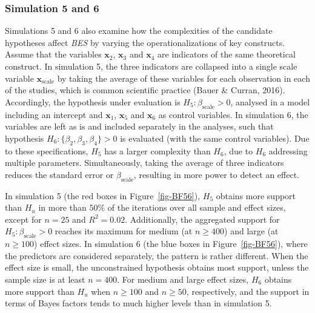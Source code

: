 \documentclass[
]{interact}
\begin{document}
\hypertarget{simulation-5-and-6}{%
\subsubsection{Simulation 5 and 6}\label{simulation-5-and-6}}

Simulations 5 and 6 also examine how the complexities of the candidate
hypotheses affect \emph{BES} by varying the operationalizations of key
constructs. Assume that the variables \(\boldsymbol{x}_2\),
\(\boldsymbol{x}_3\) and \(\boldsymbol{x}_4\) are indicators of the same
theoretical construct. In simulation 5, the three indicators are
collapsed into a single scale variable \(\boldsymbol{x}_{\text{scale}}\)
by taking the average of these variables for each observation in each of
the studies, which is common scientific practice (Bauer \& Curran,
2016). Accordingly, the hypothesis under evaluation is
\(H_5: \beta_{\text{scale}} > 0\), analysed in a model including an
intercept and \(\boldsymbol{x}_1\), \(\boldsymbol{x}_5\) and
\(\boldsymbol{x}_6\) as control variables. In simulation 6, the
variables are left as is and included separately in the analyses, such
that hypothesis \(H_6: \{\beta_2,\beta_3,\beta_4\} > 0\) is evaluated
(with the same control variables). Due to these specifications, \(H_5\)
has a larger complexity than \(H_6\), due to \(H_6\) addressing multiple
parameters. Simultaneously, taking the average of three indicators
reduces the standard error or \(\beta_{\text{scale}}\), resulting in
more power to detect an effect.

In simulation 5 (the red boxes in Figure~\ref{fig-BF56}), \(H_5\)
obtains more support than \(H_u\) in more than \(50\%\) of the
iterations over all sample and effect sizes, except for \(n = 25\) and
\(R^2 = 0.02\). Additionally, the aggregated support for
\(H_5: \beta_{\text{scale}}>0\) reaches its maximum for medium (at
\(n \geq 400\)) and large (at \(n \geq 100\)) effect sizes. In
simulation 6 (the blue boxes in Figure~\ref{fig-BF56}), where the
predictors are considered separately, the pattern is rather different.
When the effect size is small, the unconstrained hypothesis obtains most
support, unless the sample size is at least \(n = 400\). For medium and
large effect sizes, \(H_6\) obtains more support than \(H_u\) when
\(n \geq 100\) and \(n \geq 50\), respectively, and the support in terms
of Bayes factors tends to much higher levels than in simulation 5.
\end{document}
